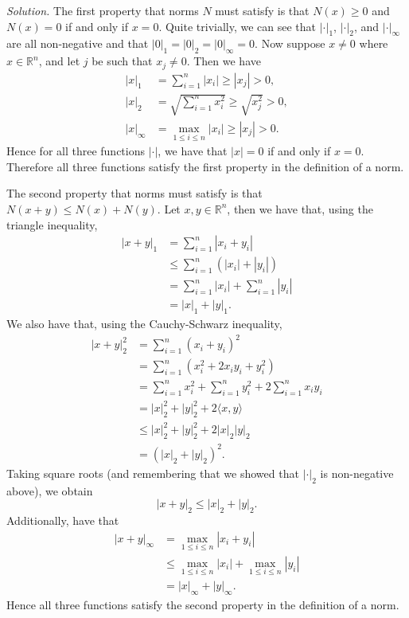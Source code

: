 \documentclass{article}
\newcommand{\R}{\mathbb{R}}
\begin{document}
\textit{Solution.}
The first property that norms $N$ must satisfy is that $N(x) \geq 0$ and
$N(x) = 0$ if and only if $x = 0$. Quite trivially, we can see
that $|\cdot|_1$, $|\cdot|_2$, and $|\cdot|_\infty$ are all non-negative
and that $|0|_1 = |0|_2 = |0|_\infty = 0$. Now suppose $x \neq 0$ where $x \in \R^n$,
and let $j$ be such that $x_j \neq 0$. Then we have
%
\begin{align*}
    |x|_1 &= \sum_{i = 1}^n |x_i| \geq |x_j| > 0, \\
    |x|_2 &= \sqrt{\sum_{i = 1}^n x_i^2} \geq \sqrt{x_j^2} > 0, \\
    |x|_\infty &= \max_{1 \leq i \leq n} |x_i| \geq |x_j| > 0.
\end{align*}
%
Hence for all three functions $|\cdot|$, we have that $|x| = 0$ if and only if $x = 0$.
Therefore all three functions satisfy the first property in the definition of a norm.

The second property that norms must satisfy is that $N(x + y) \leq N(x) + N(y)$.
Let $x, y \in \R^n$, then we have that, using the triangle inequality,
%
\begin{align*}
    |x + y|_1
        &= \sum_{i = 1}^n |x_i + y_i| \\
        &\leq \sum_{i = 1}^n (|x_i| + |y_i|) \\
        &= \sum_{i = 1}^n |x_i| + \sum_{i = 1}^n |y_i| \\
        &= |x|_1 + |y|_1
        .
\end{align*}
%
We also have that, using the Cauchy-Schwarz inequality,
%
\begin{align*}
    |x + y|_2^2
        &= \sum_{i = 1}^n (x_i + y_i)^2 \\
        &= \sum_{i = 1}^n (x_i^2 + 2 x_i y_i +  y_i^2) \\
        &= \sum_{i = 1}^n x_i^2
            + \sum_{i = 1}^n  y_i^2
            + 2 \sum_{i = 1}^n x_i y_i \\
        &= |x|_2^2 + |y|_2^2 + 2 \langle x, y \rangle \\
        &\leq |x|_2^2 + |y|_2^2 + 2 |x|_2 |y|_2 \\
        &= (|x|_2 + |y|_2)^2
        .
\end{align*}
%
Taking square roots (and remembering that we showed that $|\cdot|_2$
is non-negative above), we obtain
%
\begin{equation*}
    |x + y|_2 \leq |x|_2 + |y|_2
    .
\end{equation*}
%
Additionally, have that
%
\begin{align*}
    |x + y|_\infty
        &= \max_{1 \leq i \leq n} |x_i + y_i| \\
        &\leq \max_{1 \leq i \leq n} |x_i|
            + \max_{1 \leq i \leq n} |y_i| \\
        &= |x|_\infty + |y|_\infty
        .
\end{align*}
%
Hence all three functions satisfy the second property in the definition of a norm.
\end{document}
